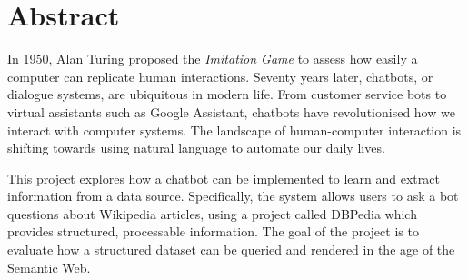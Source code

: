 \chapter*{Abstract}
In 1950, Alan Turing proposed the {\it Imitation Game} to assess how easily a computer can replicate human interactions. Seventy years later, chatbots, or dialogue systems, are ubiquitous in modern life. From customer service bots to virtual assistants such as Google Assistant, chatbots have revolutionised how we interact with computer systems. The landscape of human-computer interaction is shifting towards using natural language to automate our daily lives.

This project explores how a chatbot can be implemented to learn and extract information from a data source. Specifically, the system allows users to ask a bot questions about Wikipedia articles, using a project called DBPedia which provides structured, processable information. The goal of the project is to evaluate how a structured dataset can be queried and rendered in the age of the Semantic Web.

